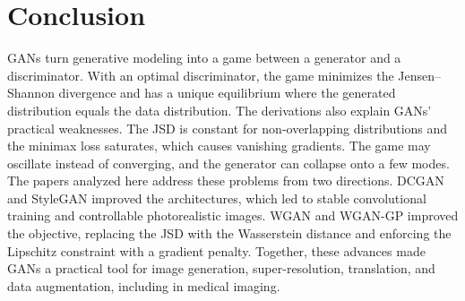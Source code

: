\documentclass[conference]{IEEEtran}
\begin{document}
\section{Conclusion}
GANs turn generative modeling into a game between a generator and a discriminator. With an optimal discriminator, the game minimizes the Jensen--Shannon divergence and has a unique equilibrium where the generated distribution equals the data distribution. The derivations also explain GANs' practical weaknesses. The JSD is constant for non-overlapping distributions and the minimax loss saturates, which causes vanishing gradients. The game may oscillate instead of converging, and the generator can collapse onto a few modes. The papers analyzed here address these problems from two directions. DCGAN and StyleGAN improved the architectures, which led to stable convolutional training and controllable photorealistic images. WGAN and WGAN-GP improved the objective, replacing the JSD with the Wasserstein distance and enforcing the Lipschitz constraint with a gradient penalty. Together, these advances made GANs a practical tool for image generation, super-resolution, translation, and data augmentation, including in medical imaging.



\end{document}
